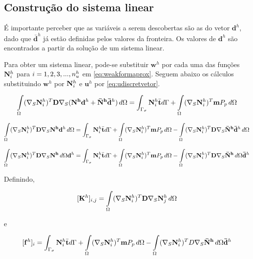 \subsection{Construção do sistema linear}

É importante perceber que as variáveis a serem descobertas são as do vetor $\mathbf{d}^h$, dado que $\mathbf{\bar{d}}^h$ já estão definidas pelos valores da fronteira. Os valores de $\mathbf{d}^h$ são encontrados a partir da solução de um sistema linear.

Para obter um sistema linear, pode-se substituir $\mathbf{w}^h$ por cada uma das funções ${\mathbf{N}_{i}^h}$ para $i = 1, 2, 3, ..., n_u^h$ em \eqref{eq:weakformaprox}. Seguem abaixo os cálculos substituindo $\mathbf{w}^h$ por ${\mathbf{N}_{i}^h}$ e $\mathbf{u}^h$ por \eqref{eq:udiscretvetor}.


\begin{equation}
\int\limits_{\Omega}  (\nabla_S {\mathbf{N}_{i}^h})^T \mathbf{D}\nabla_S (\mathbf{N^h} \mathbf{d}^h + \mathbf{\bar{N}^h} \mathbf{\bar{d}}^h ) \, d\Omega = \int_{\Gamma_\sigma} {\mathbf{N}_{i}^h} \bar{\mathbf{t}} d\Gamma + \int\limits_{\Omega} (\nabla_S {\mathbf{N}_{i}^h})^T \mathbf{m} P_p \, d\Omega
\end{equation}

\begin{equation*}
\int\limits_{\Omega}  (\nabla_S {\mathbf{N}_{i}^h})^T \mathbf{D}\nabla_S \mathbf{N^h} \mathbf{d}^h  \, d\Omega  = \int_{\Gamma_\sigma} {\mathbf{N}_{i}^h} \bar{\mathbf{t}} d\Gamma + \int\limits_{\Omega} (\nabla_S {\mathbf{N}_{i}^h})^T \mathbf{m} P_p \, d\Omega - \int\limits_{\Omega}  (\nabla_S {\mathbf{N}_{i}^h})^T \mathbf{D}\nabla_S  \mathbf{\bar{N}^h} \mathbf{\bar{d}}^h \, d\Omega
\end{equation*}

\begin{equation}\label{eq:umaequacaosistema}
\int\limits_{\Omega}  (\nabla_S {\mathbf{N}_{i}^h})^T \mathbf{D}\nabla_S \mathbf{N^h} \, d\Omega  \mathbf{d}^h   = \int_{\Gamma_\sigma} {\mathbf{N}_{i}^h} \bar{\mathbf{t}} d\Gamma + \int\limits_{\Omega} (\nabla_S {\mathbf{N}_{i}^h})^T \mathbf{m} P_p \, d\Omega - \int\limits_{\Omega}  (\nabla_S {\mathbf{N}_{i}^h})^T \mathbf{D}\nabla_S  \mathbf{\bar{N}^h}  \, d\Omega \mathbf{\bar{d}}^h
\end{equation}


Definindo,

\begin{equation}\label{eq:entradamatriz}
    [\mathbf{K}^h]_{i,j} = \int\limits_{\Omega} (\nabla_S {\mathbf{N}_{i}^h})^T \mathbf{D} \nabla_S {\mathbf{N}_{j}^h} \, d\Omega 
\end{equation}

e

\begin{equation}\label{eq:entradald}
    [\mathbf{f}^h]_i = \int_{\Gamma_\sigma} {\mathbf{N}_{i}^h} \bar{\mathbf{t}} d\Gamma + \int\limits_{\Omega} (\nabla_S {\mathbf{N}_{i}^h})^T \mathbf{m} P_p \, d\Omega - \int\limits_{\Omega}  (\nabla_S {\mathbf{N}_{i}^h})^T D \nabla_S  \mathbf{\bar{N}^h}  \, d\Omega \mathbf{\bar{d}}^h
\end{equation}



